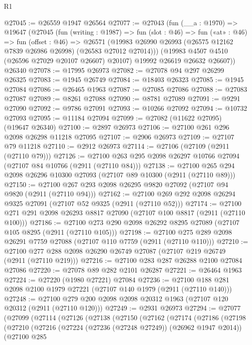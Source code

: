 \begin{lexlean}{R1}
\begin{coremodule}
@27045 := @26559 @1947 @26564
@27077 := @27043
    (fun (__a : @1970) =>
    @19647
      (@27045
        (fun (writing : @1987) =>
        fun (slot : @46) =>
        fun («at» : @46) =>
        fun (offset : @46) =>
        @26571 (@19983 @26990 @26993 (@26575 @12162 @7839 @26986 @26998) (@26583 @27012 @27014)))
        (@19983 @4507 @4510 (@26596 @27029 @20107 @26607) @20107)
        @19992
        @26619
        @26632
        @26607))
    @26340
@27078 := @17995 @26973
@27082 := @27078 @94 @297 @26299 @26325
@27083 := @1945 @26749
@27084 := @18403 @26323
@27085 := @1945 @27084
@27086 := @26465 @1963
@27087 := @27085 @27086
@27088 := @27083 @27087
@27089 := @8261 @27088
@27090 := @8781 @27089
@27091 := @9291 @27090
@27092 := @9786 @27091
@27093 := @10266 @27092
@27094 := @10732 @27093
@27095 := @11184 @27094
@27099 := @27082 (@11622 @27095) (@19647 @26340)
@27100 := @2897 @26973
@27106 := @27100 @261 @296 @2098 @26298 @11218 @27095
@27107 := @2906 @26973
@27109 := @27107 @79 @11218
@27110 := @2912 @26973
@27114 := @27106 (@27109 (@2911 (@27110 @79)))
@27126 := @27100 @263 @295 @2098 @26297 @10766 @27094 (@27107 @84 @10766 (@2911 (@27110 @84)))
@27138 := @27100 @265 @294 @2098 @26296 @10300 @27093 (@27107 @89 @10300 (@2911 (@27110 @89)))
@27150 := @27100 @267 @293 @2098 @26295 @9820 @27092 (@27107 @94 @9820 (@2911 (@27110 @94)))
@27162 := @27100 @269 @292 @2098 @26294 @9325 @27091 (@27107 @52 @9325 (@2911 (@27110 @52)))
@27174 := @27100 @271 @291 @2098 @26293 @8817 @27090 (@27107 @100 @8817 (@2911 (@27110 @100)))
@27186 := @27100 @273 @290 @2098 @26292 @8295 @27089 (@27107 @105 @8295 (@2911 (@27110 @105)))
@27198 := @27100 @275 @289 @2098 @26291 @7759 @27088 (@27107 @110 @7759 (@2911 (@27110 @110)))
@27210 := @27100 @277 @288 @2098 @26290 @26749 @27087 (@27107 @219 @26749 (@2911 (@27110 @219)))
@27216 := @27100 @283 @287 @26288 @2100 @27084 @27086
@27220 := @27078 @89 @282 @2101 @26287
@27221 := @26464 @1963
@27224 := @27220 (@1980 @27221) @27084
@27236 := @27100 @188 @281 @2098 @2100 @1979 @27221 (@27107 @140 @1979 (@2911 (@27110 @140)))
@27248 := @27100 @279 @200 @2098 @2098 @20312 @1963 (@27107 @120 @20312 (@2911 (@27110 @120)))
@27249 := @2931 @26973
@27294 := @27077
    (@27099
      (@27114
        (@27126
          (@27138
            (@27150
              (@27162
                (@27174
                  (@27186
                    (@27198
                      (@27210
                        (@27216
                          (@27224 (@27236 (@27248 @27249)) (@26962 @1947 @2014))
                          (@27100
                            @285

\end{coremodule}
\end{lexlean}
